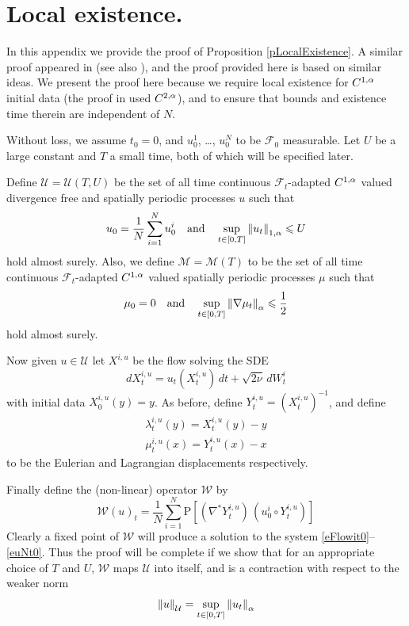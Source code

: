 \documentclass[final]{amsart}%
\newcommand{\mceulert}{\eqref{eFlowit0}--\eqref{euNt0}\xspace}
\newcommand{\inv}{^{-1}}
\newcommand{\transpose}{^*}
\newcommand{\grad}{\nabla}
\newcommand{\gradt}{\grad\transpose}
\renewcommand{\leq}{\leqslant}
\newcommand{\F}{\mathcal{F}}
\newcommand{\lhp}{\boldsymbol{\mathrm{P}}}
\newcommand{\W}{\mathcal{W}}
\newcommand{\holderspace}[2]{\ensuremath{C^{\ifx0#1{#2}\else{#1,#2}\fi}}}
\newcommand{\U}{\mathcal{U}}
\newcommand{\M}{\mathcal{M}}
\newif\iftextstyle
\newcommand{\norm}[1]{\iftextstyle\lVert#1\rVert\else\left\lVert#1\right\rVert\fi}
\newcommand{\holdernorm}[3]{\norm{#1}_{\ifx0#2{#3}\else{#2,#3}\fi}}
\numberwithin{equation}{section}
\theoremstyle{definition}
\theoremstyle{remark}
\begin{document}
\section{Local existence.}\label{aLocalExistence}%
In this appendix we provide the proof of Proposition
\ref{pLocalExistence}. A similar proof appeared in \cite{sperturb}
(see also \cite{ele}), and the proof provided here is based on similar
ideas. We present the proof here because we require local existence
for $\holderspace{1}{\alpha}$ initial data (the proof in
\cite{sperturb} used $\holderspace{2}{\alpha}$), and to ensure that
bounds and existence time therein are independent of $N$.

Without loss, we assume $t_0 = 0$, and $u_0^1$, \dots, $u_0^N$ to be
$\F_0$ measurable. Let $U$ be a large constant and $T$ a small time,
both of which will be specified later.

Define $\U = \U(T,U)$ be the set of all time continuous $\F_t$-adapted
$\holderspace{1}{\alpha}$ valued divergence free and spatially
periodic processes $u$ such that
$$
u_0 = \frac{1}{N} \sum_{i=1}^N u^i_0 \quad\text{and}\quad \sup_{t \in
  [0,T]} \holdernorm{u_t}{1}{\alpha} \leq U
$$
hold almost surely. Also, we define $\M = \M(T)$ to be the set of all
time continuous $\F_t$-adapted $\holderspace{1}{\alpha}$ valued
spatially periodic processes $\mu$ such that
$$
\mu_0 = 0 \quad\text{and}\quad \sup_{t \in [0,T]} \holdernorm{\grad
  \mu_t}{0}{\alpha} \leq \frac{1}{2}
$$
hold almost surely.

Now given $u \in \U$ let $X^{i,u}$ be the flow solving the SDE
$$
dX^{i,u}_t = u_t(X^{i,u}_t) \, dt + \sqrt{2\nu} \, dW^i_t
$$
with initial data $X^{i,u}_0(y) = y$. As before, define $Y^{i,u}_t =
(X^{i,u}_t)\inv$, and define
\begin{gather*}
\lambda^{i,u}_t(y) = X^{i,u}_t(y) - y\\
\mu^{i,u}_t(x) = Y^{i,u}_t(x) - x
\end{gather*}
to be the Eulerian and Lagrangian displacements respectively.

Finally define the (non-linear) operator $\W$ by
$$
\W(u)_t = \frac{1}{N} \sum_{i=1}^N \lhp\left[ \left( \gradt Y^{i,u}_t
  \right)\, \left( u^i_0 \circ Y^{i,u}_t \right) \right] 
$$
Clearly a fixed point of $\W$ will produce a solution to the system
\mceulert. Thus the proof will be complete if we show that for an
appropriate choice of $T$ and $U$, $\W$ maps $\U$ into itself, and is a
contraction with respect to the weaker norm
$$
\norm{u}_\U = \sup_{t \in [0,T]} \holdernorm{u_t}{0}{\alpha}
$$
\end{document}
